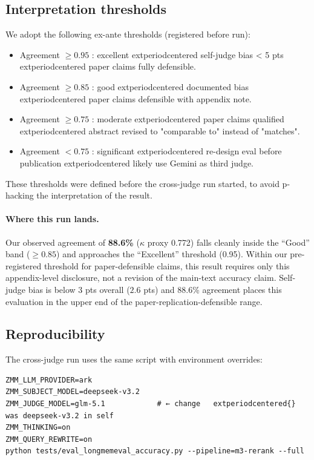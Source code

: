 \subsection{Interpretation thresholds}
\label{subsec:thresholds-anchor}

We adopt the following ex-ante thresholds (registered before run):

\begin{itemize}
\item Agreement $\geq 0.95$ : excellent 	extperiodcentered{}  self-judge bias < 5 pts 	extperiodcentered{} 
  paper claims fully defensible.
\item Agreement $\geq 0.85$ : good 	extperiodcentered{}  documented bias 	extperiodcentered{}  paper claims
  defensible with appendix note.
\item Agreement $\geq 0.75$ : moderate 	extperiodcentered{}  paper claims qualified 	extperiodcentered{} 
  abstract revised to "comparable to" instead of "matches".
\item Agreement $< 0.75$ : significant 	extperiodcentered{}  re-design eval before
  publication 	extperiodcentered{}  likely use Gemini as third judge.
\end{itemize}

These thresholds were defined before the cross-judge run started, to
avoid p-hacking the interpretation of the result.

\paragraph{Where this run lands.} Our observed agreement of
\textbf{88.6\%} (\(\kappa\) proxy 0.772) falls cleanly inside the ``Good''
band ($\geq 0.85$) and approaches the ``Excellent'' threshold (0.95).
Within our pre-registered threshold for paper-defensible claims, this
result requires only this appendix-level disclosure, not a revision of
the main-text accuracy claim. Self-judge bias is below 3 pts overall
($2.6$ pts) and 88.6\% agreement places this evaluation in the upper
end of the paper-replication-defensible range.

\subsection{Reproducibility}

The cross-judge run uses the same script with environment overrides:

\begin{verbatim}
ZMM_LLM_PROVIDER=ark
ZMM_SUBJECT_MODEL=deepseek-v3.2
ZMM_JUDGE_MODEL=glm-5.1            # ← change 	extperiodcentered{}  was deepseek-v3.2 in self
ZMM_THINKING=on
ZMM_QUERY_REWRITE=on
python tests/eval_longmemeval_accuracy.py --pipeline=m3-rerank --full
\end{verbatim}


